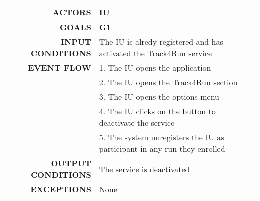 \begin{table}[h!]
\begin{tabular}{|r|p{3in}|}
\hline
\textbf{ACTORS} & IU\\
\hline
\textbf{GOALS} & \textbf{G1} \\
\hline
\textbf{INPUT CONDITIONS} & The IU is alredy registered and has activated the Track4Run service \\
\hline
\textbf{EVENT FLOW} 
&1. The IU opens the application \\
&2. The IU opens the Track4Run section\\
&3. The IU opens the options menu\\
&4. The IU clicks on the button to deactivate the service \\
&5. The system unregisters the IU as participant in any run they enrolled \\
\hline
\textbf{OUTPUT CONDITIONS} & The service is deactivated  \\
\hline
\textbf{EXCEPTIONS} 
& None \\
\hline
\end{tabular}
\end{table}
